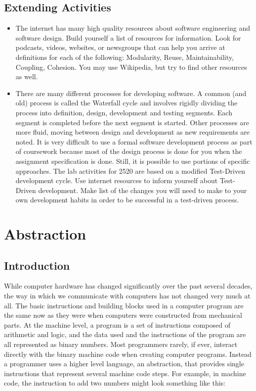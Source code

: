\section{Extending Activities}

\begin{itemize}

\item The internet has many high quality resources about software engineering and software design.  Build yourself a list of resources for information.  Look for podcasts, videos, websites, or newsgroups that can help you arrive at definitions for each of the following:   Modularity,   Reuse, Maintainability,   Coupling,   Cohesion.     You may use Wikipedia, but try to find other resources as well.



\item There are many different processes for developing software.  A common (and old) process is called the Waterfall cycle and involves rigidly dividing the process into definition, design, development and testing segments.  Each segment is completed before the next segment is started.  Other processes are more fluid, moving between design and development as new requirements are noted.
 It is very difficult to use a formal software development process as part of coursework because most of the design process is done for you when the assignment specification is done.   Still, it is possible to use portions of specific approaches.   The lab activities for 2520 are based on a modified Test-Driven development cycle.    Use internet resources to inform yourself about Test-Driven development.  Make list of the changes you will need to make to your own development habits in order to be successful in a test-driven process.
\end{itemize}

\chapter{Abstraction}

\section{Introduction}
While computer hardware has changed significantly over the past several decades, the way in which we communicate with computers has not changed very much at all. The basic instructions and building blocks used in a computer program are the same now as they were when computers were constructed from mechanical parts.
At the machine level, a program is a set of instructions composed of arithmetic and logic, and the data used and the instructions of the program are all represented as binary numbers. Most programmers rarely, if ever, interact directly with the binary machine code when creating computer programs. Instead a programmer uses a higher level language, an abstraction, that provides single instructions that represent several machine code steps.
For example, in machine code, the instruction to add two numbers might look something like this:

